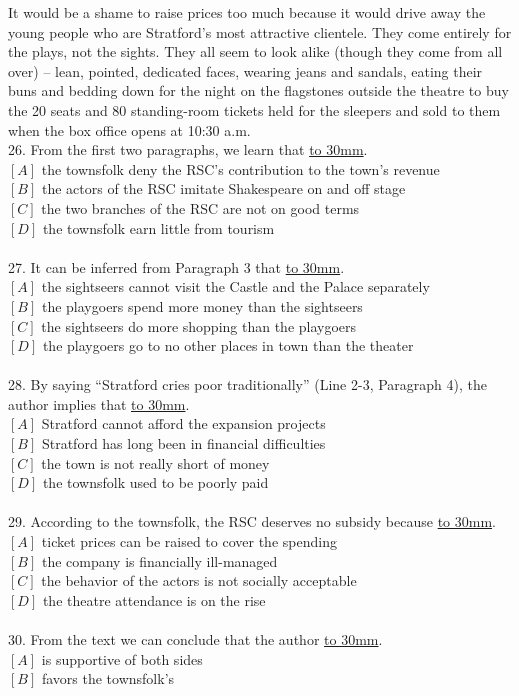 \documentclass[a4paper]{article}
\begin{document}
\par
It would be a shame to raise prices too much because it would drive away the young people who are Stratford’s most attractive clientele. They come entirely for the plays, not the sights. They all seem to look alike (though they come from all over) -- lean, pointed, dedicated faces, wearing jeans and sandals, eating their buns and bedding down for the night on the flagstones outside the theatre to buy the 20 seats and 80 standing-room tickets held for the sleepers and sold to them when the box office opens at 10:30 a.m.
\\26.	From the first two paragraphs, we learn that \underline{\hbox to 30mm{}}.\\$[A]$ the townsfolk deny the RSC’s contribution to the town’s revenue\\$[B]$ the actors of the RSC imitate Shakespeare on and off stage\\$[C]$ the two branches of the RSC are not on good terms\\$[D]$ the townsfolk earn little from tourism\\\\27.	It can be inferred from Paragraph 3 that \underline{\hbox to 30mm{}}.\\$[A]$ the sightseers cannot visit the Castle and the Palace separately\\$[B]$ the playgoers spend more money than the sightseers\\$[C]$ the sightseers do more shopping than the playgoers\\$[D]$ the playgoers go to no other places in town than the theater\\\\28.	By saying “Stratford cries poor traditionally” (Line 2-3, Paragraph 4), the author implies that \underline{\hbox to 30mm{}}.\\$[A]$ Stratford cannot afford the expansion projects\\$[B]$ Stratford has long been in financial difficulties\\$[C]$ the town is not really short of money\\$[D]$ the townsfolk used to be poorly paid\\\\29.	According to the townsfolk, the RSC deserves no subsidy because \underline{\hbox to 30mm{}}.\\$[A]$ ticket prices can be raised to cover the spending\\$[B]$ the company is financially ill-managed\\$[C]$ the behavior of the actors is not socially acceptable\\$[D]$ the theatre attendance is on the rise\\\\30.	From the text we can conclude that the author \underline{\hbox to 30mm{}}.\\$[A]$ is supportive of both sides\\$[B]$ favors the townsfolk’s 
\end{document}
